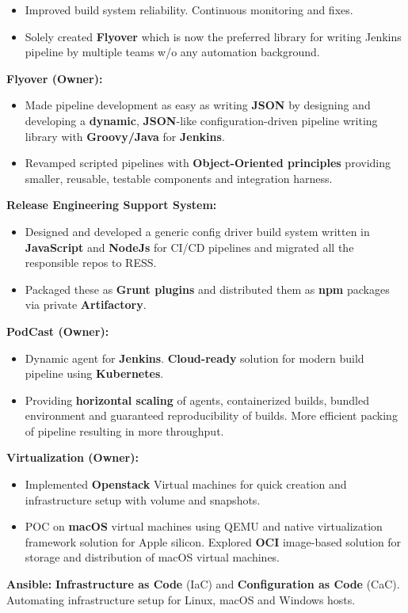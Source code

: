 \begin{cventries}
{\begin{itemize}
            \item Improved build system reliability. Continuous monitoring and fixes.
            \item Solely created \textbf{Flyover} which is now the preferred library for writing Jenkins pipeline by multiple teams w/o any automation background.
        \end{itemize}
        \item \textbf{Flyover (Owner):}
        \begin{itemize}
            \item Made pipeline development as easy as writing \textbf{JSON} by designing and developing a \textbf{dynamic}, \textbf{JSON}-like configuration-driven pipeline writing library with \textbf{Groovy/Java} for \textbf{Jenkins}.
            \item Revamped scripted pipelines with \textbf{Object-Oriented principles} providing smaller, reusable, testable components and integration harness.
        \end{itemize}
        \item \textbf{Release Engineering Support System:} 
        \begin{itemize}
            \item Designed and developed a generic config driver build system written in \textbf{JavaScript} and \textbf{NodeJs} for CI/CD pipelines and migrated all the responsible repos to RESS. 
            \item Packaged these as \textbf{Grunt plugins} and distributed them as \textbf{npm} packages via private \textbf{Artifactory}.
        \end{itemize}
        \item \textbf{PodCast (Owner):} 
        \begin{itemize}
            \item Dynamic agent for \textbf{Jenkins}. \textbf{Cloud-ready} solution for modern build pipeline using \textbf{Kubernetes}. 
            \item Providing \textbf{horizontal scaling} of agents, containerized builds, bundled environment and guaranteed reproducibility of builds. More efficient packing of pipeline resulting in more throughput.
        \end{itemize}
        \item \textbf{Virtualization (Owner):}
        \begin{itemize}
            \item Implemented \textbf{Openstack} Virtual machines for quick creation and infrastructure setup with volume and snapshots.
            \item POC on \textbf{macOS} virtual machines using QEMU and native virtualization framework solution for Apple silicon. Explored \textbf{OCI} image-based solution for storage and distribution of macOS virtual machines.
        \end{itemize}
        \item \textbf{Ansible:} \textbf{Infrastructure as Code} (IaC) and \textbf{Configuration as Code} (CaC). Automating infrastructure setup for Linux, macOS and Windows hosts.
    }


\end{cventries}
